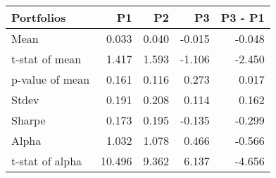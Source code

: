 \begin{tabular}{lrrrr}
\toprule
Portfolios & P1 & P2 & P3 & P3 - P1 \\
\midrule
Mean & 0.033 & 0.040 & -0.015 & -0.048 \\
t-stat of mean & 1.417 & 1.593 & -1.106 & -2.450 \\
p-value of mean & 0.161 & 0.116 & 0.273 & 0.017 \\
Stdev & 0.191 & 0.208 & 0.114 & 0.162 \\
Sharpe & 0.173 & 0.195 & -0.135 & -0.299 \\
Alpha & 1.032 & 1.078 & 0.466 & -0.566 \\
t-stat of alpha & 10.496 & 9.362 & 6.137 & -4.656 \\
\bottomrule
\end{tabular}
